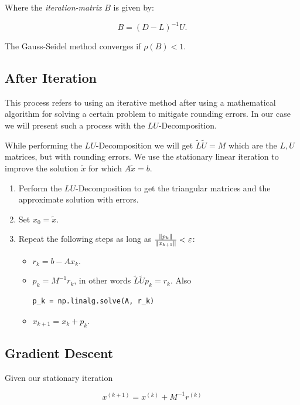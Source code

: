 Where the \emph{iteration-matrix} \(B\) is given by: 

\[
    B = (D - L)^{-1}U.
\]

The Gauss-Seidel method converges if \(\rho(B) < 1\).


\subsection{After Iteration}

This process refers to using an iterative method after using a mathematical algorithm for solving a certain problem to 
mitigate rounding errors. In our case we will present such a process with the \(LU\)-Decomposition.

While performing the \(LU\)-Decomposition we will get \(\tilde{L}\tilde{U} = M\) which are the \(L,U\) matrices, but with rounding errors.
We use the stationary linear iteration to improve the solution \(\tilde{x}\) for which \(A\tilde{x} = b\).

\begin{enumerate}

    \item Perform the \(LU\)-Decomposition to get the triangular matrices and the approximate solution with errors.

    \item Set \(x_0 = \tilde{x}\).

    \item Repeat the following steps as long as \(\frac{\left\| p_k \right\|}{\left\| x_{k + 1} \right\|} < \varepsilon\): 
    
    \begin{itemize}
        \item \(r_k = b - Ax_k \).
        \item \(p_k = M^{-1}r_k\), in other words \(\tilde{L}\tilde{U}p_k = r_k\). Also \begin{verbatim}p_k = np.linalg.solve(A, r_k)\end{verbatim}
        \item \(x_{k + 1} = x_k + p_k\).
    \end{itemize}
\end{enumerate}

\subsection{Gradient Descent}

Given our stationary iteration 

\[
    x^{(k + 1)} = x^{(k)} + M^{-1}r^{(k)}
\]

